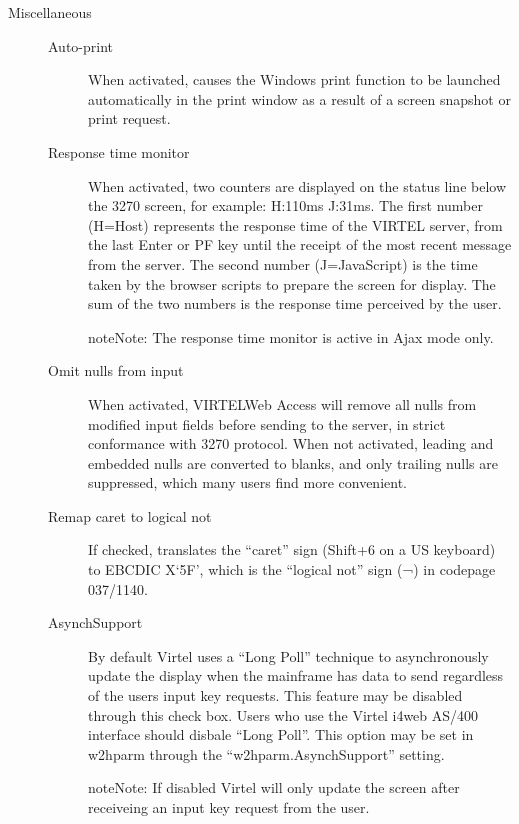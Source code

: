 \documentclass[letterpaper,10pt,english]{sphinxmanual}
\begin{document}
\begin{description}
\begin{description}
\end{description}

\item[{Miscellaneous}] \leavevmode\begin{description}
\item[{Auto-print}] \leavevmode
When activated, causes the Windows print function to be launched automatically in the print window as a result of a screen snapshot or print request.

\item[{Response time monitor}] \leavevmode
When activated, two counters are displayed on the status line below the 3270 screen, for example: H:110ms J:31ms. The first number (H=Host) represents the response time of the VIRTEL server, from the last Enter or PF key until the receipt of the most recent message from the server. The second number (J=JavaScript) is the time taken by the browser scripts to prepare the screen for display. The sum of the two numbers is the response time perceived by the user.

\begin{sphinxadmonition}{note}{Note:}
The response time monitor is active in Ajax mode only.
\end{sphinxadmonition}

\item[{Omit nulls from input}] \leavevmode
When activated, VIRTELWeb Access will remove all nulls from modified input fields before sending to the server, in strict conformance with 3270 protocol. When not activated, leading and embedded nulls are converted to blanks, and only trailing nulls are suppressed, which many users find more convenient.

\item[{Remap caret to logical not}] \leavevmode
If checked, translates the “caret” sign (Shift+6 on a US keyboard) to EBCDIC X‘5F’, which is the “logical not” sign (¬) in codepage 037/1140.

\item[{AsynchSupport}] \leavevmode
By default Virtel uses a “Long Poll” technique to asynchronously update the display when the mainframe has data to send regardless of the users input key requests. This feature may be disabled through this check box. Users who use the Virtel i4web AS/400 interface should disbale “Long Poll”. This option may be set in w2hparm through the “w2hparm.AsynchSupport” setting.

\begin{sphinxadmonition}{note}{Note:}
If disabled Virtel will only update the screen after receiveing an input key request from the user.
\end{sphinxadmonition}

\end{description}

\end{description}
\end{document}
